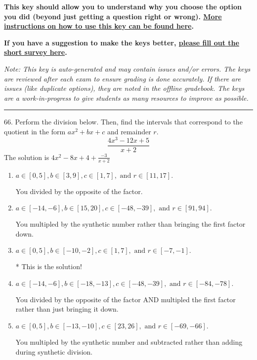 \documentclass{extbook}[14pt]
\begin{document}
\textbf{This key should allow you to understand why you choose the option you did (beyond just getting a question right or wrong). \href{https://xronos.clas.ufl.edu/mac1105spring2020/courseDescriptionAndMisc/Exams/LearningFromResults}{More instructions on how to use this key can be found here}.}

\textbf{If you have a suggestion to make the keys better, \href{https://forms.gle/CZkbZmPbC9XALEE88}{please fill out the short survey here}.}

\textit{Note: This key is auto-generated and may contain issues and/or errors. The keys are reviewed after each exam to ensure grading is done accurately. If there are issues (like duplicate options), they are noted in the offline gradebook. The keys are a work-in-progress to give students as many resources to improve as possible.}

\rule{\textwidth}{0.4pt}

66. Perform the division below. Then, find the intervals that correspond to the quotient in the form $ax^2+bx+c$ and remainder $r$.
\[ \frac{4x^{3} -12 x + 5}{x + 2} \] 
The solution is $ 4x^{2} -8 x + 4 + \frac{-3}{x + 2} $ 

\begin{enumerate}[label=\Alph*.] 
\item $ a \in [0, 5], b \in [3, 9], c \in [1, 7], \text{ and } r \in [11, 17]. $ 

  You divided by the opposite of the factor. 
\item $ a \in [-14, -6], b \in [15, 20], c \in [-48, -39], \text{ and } r \in [91, 94]. $ 

  You multipled by the synthetic number rather than bringing the first factor down. 
\item $ a \in [0, 5], b \in [-10, -2], c \in [1, 7], \text{ and } r \in [-7, -1]. $ 

 * This is the solution! 
\item $ a \in [-14, -6], b \in [-18, -13], c \in [-48, -39], \text{ and } r \in [-84, -78]. $ 

  You divided by the opposite of the factor AND multipled the first factor rather than just bringing it down. 
\item $ a \in [0, 5], b \in [-13, -10], c \in [23, 26], \text{ and } r \in [-69, -66]. $ 

  You multipled by the synthetic number and subtracted rather than adding during synthetic division. 
\end{enumerate} 
 
\end{document}
